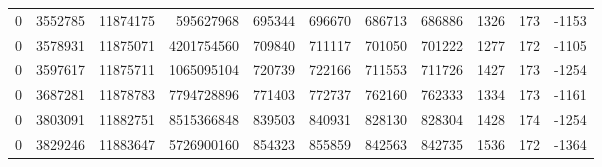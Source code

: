 \begin{tabular}{rrrrrrrrrrr}
0 & 3552785 & 11874175 & 595627968 & 695344 & 696670 & 686713 & 686886 & 1326 & 173 & -1153 \\
0 & 3578931 & 11875071 & 4201754560 & 709840 & 711117 & 701050 & 701222 & 1277 & 172 & -1105 \\
0 & 3597617 & 11875711 & 1065095104 & 720739 & 722166 & 711553 & 711726 & 1427 & 173 & -1254 \\
0 & 3687281 & 11878783 & 7794728896 & 771403 & 772737 & 762160 & 762333 & 1334 & 173 & -1161 \\
0 & 3803091 & 11882751 & 8515366848 & 839503 & 840931 & 828130 & 828304 & 1428 & 174 & -1254 \\
0 & 3829246 & 11883647 & 5726900160 & 854323 & 855859 & 842563 & 842735 & 1536 & 172 & -1364 \\
\bottomrule
\end{tabular}
